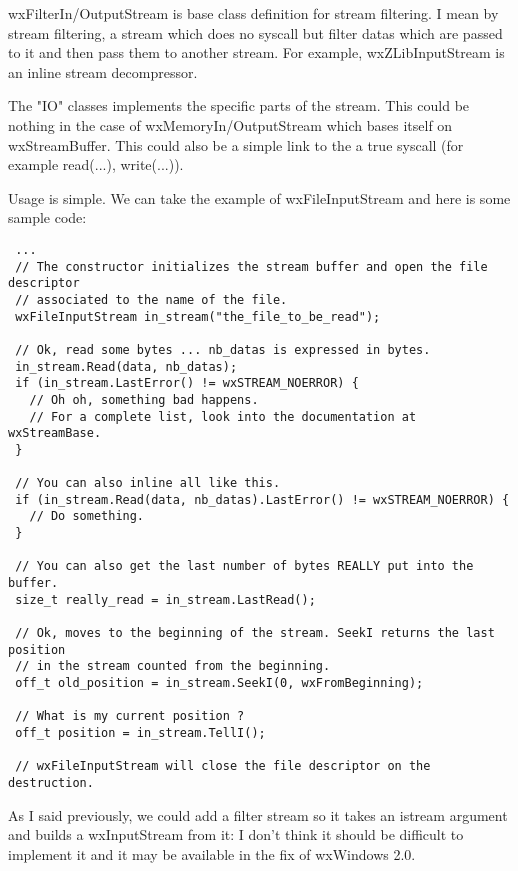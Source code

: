 wxFilterIn/OutputStream is base class definition for stream filtering.
I mean by stream filtering, a stream which does no syscall but filter datas
which are passed to it and then pass them to another stream.
For example, wxZLibInputStream is an inline stream decompressor.

The "IO" classes implements the specific parts of the stream. This could be
nothing in the case of wxMemoryIn/OutputStream which bases itself on
wxStreamBuffer. This could also be a simple link to the a true syscall
(for example read(...), write(...)).


Usage is simple. We can take the example of wxFileInputStream and here is some sample
code:

\begin{verbatim}
 ...
 // The constructor initializes the stream buffer and open the file descriptor
 // associated to the name of the file.
 wxFileInputStream in_stream("the_file_to_be_read");

 // Ok, read some bytes ... nb_datas is expressed in bytes.
 in_stream.Read(data, nb_datas);
 if (in_stream.LastError() != wxSTREAM_NOERROR) {
   // Oh oh, something bad happens.
   // For a complete list, look into the documentation at wxStreamBase.
 }

 // You can also inline all like this.
 if (in_stream.Read(data, nb_datas).LastError() != wxSTREAM_NOERROR) {
   // Do something.
 }

 // You can also get the last number of bytes REALLY put into the buffer.
 size_t really_read = in_stream.LastRead();

 // Ok, moves to the beginning of the stream. SeekI returns the last position 
 // in the stream counted from the beginning.
 off_t old_position = in_stream.SeekI(0, wxFromBeginning);
 
 // What is my current position ?
 off_t position = in_stream.TellI();

 // wxFileInputStream will close the file descriptor on the destruction.
\end{verbatim}


As I said previously, we could add a filter stream so it takes an istream
argument and builds a wxInputStream from it: I don't think it should 
be difficult to implement it and it may be available in the fix of wxWindows 2.0.

